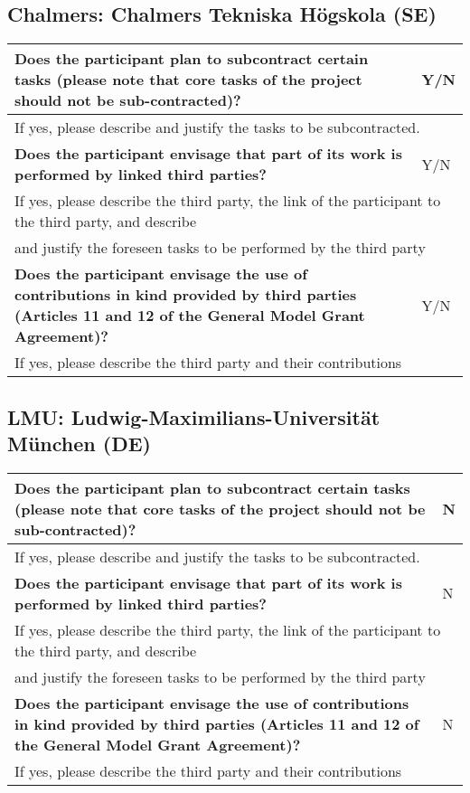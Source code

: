 \subsection{Chalmers: Chalmers Tekniska Högskola (SE)}

\begin{longtable}{|p{}|p{}|}
\hline
{\bf Does the participant plan to subcontract certain tasks (please
  note that core tasks of the project should not be sub-contracted)?}
&
Y/N
\\
\hline
\multicolumn{2}{|l|}{
If yes, please describe and justify the tasks to be subcontracted.}
\\
\hline
{\bf Does the participant envisage that  part of its work is performed
  by linked third parties?}
&
Y/N
\\
\hline
\multicolumn{2}{|l|}{If yes, please describe the third party, the link of the
  participant to the third party, and describe}\\
\multicolumn{2}{|l|}{and justify the foreseen
tasks to be performed by the third party}
\\
\hline
{\bf Does the participant envisage the use of contributions in kind
provided by third parties (Articles 11 and 12 of the General Model
Grant Agreement)?}
&
Y/N
\\
\hline
\multicolumn{2}{|l|}{If yes, please describe the third party and their contributions}
\\
\hline
\end{longtable}

\subsection{LMU: Ludwig-Maximilians-Universität München (DE)}

\begin{longtable}{|p{}|p{}|}
\hline
{\bf Does the participant plan to subcontract certain tasks (please
  note that core tasks of the project should not be sub-contracted)?}
&
N
\\
\hline
\multicolumn{2}{|l|}{
If yes, please describe and justify the tasks to be subcontracted.}
\\
\hline
{\bf Does the participant envisage that  part of its work is performed
  by linked third parties?}
&
N
\\
\hline
\multicolumn{2}{|l|}{If yes, please describe the third party, the link of the
  participant to the third party, and describe}\\
\multicolumn{2}{|l|}{and justify the foreseen
tasks to be performed by the third party}
\\
\hline
{\bf Does the participant envisage the use of contributions in kind
provided by third parties (Articles 11 and 12 of the General Model
Grant Agreement)?}
&
N
\\
\hline
\multicolumn{2}{|l|}{If yes, please describe the third party and their contributions}
\\
\hline
\end{longtable}

